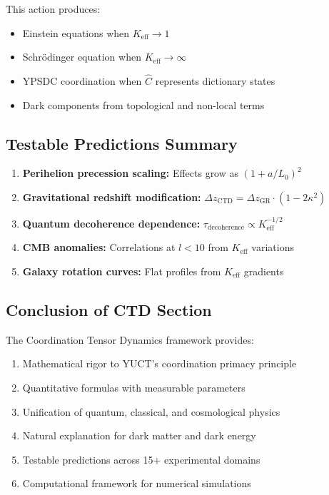 \documentclass[11pt,a4paper]{article}
\begin{document}
This action produces:
\begin{itemize}
	\item Einstein equations when $K_{\mathrm{eff}} \to 1$
	\item Schrödinger equation when $K_{\mathrm{eff}} \to \infty$  
	\item YPSDC coordination when $\hat{C}$ represents dictionary states
	\item Dark components from topological and non-local terms
\end{itemize}

\subsection{Testable Predictions Summary}

\begin{enumerate}
	\item \textbf{Perihelion precession scaling:} Effects grow as $(1 + a/L_0)^2$
	\item \textbf{Gravitational redshift modification:} $\Delta z_{\mathrm{CTD}} = \Delta z_{\mathrm{GR}} \cdot (1 - 2\kappa^2)$
	\item \textbf{Quantum decoherence dependence:} $\tau_{\mathrm{decoherence}} \propto K_{\mathrm{eff}}^{-1/2}$
	\item \textbf{CMB anomalies:} Correlations at $l < 10$ from $K_{\mathrm{eff}}$ variations
	\item \textbf{Galaxy rotation curves:} Flat profiles from $K_{\mathrm{eff}}$ gradients
\end{enumerate}

\subsection{Conclusion of CTD Section}

The Coordination Tensor Dynamics framework provides:
\begin{enumerate}
	\item Mathematical rigor to YUCT's coordination primacy principle
	\item Quantitative formulas with measurable parameters
	\item Unification of quantum, classical, and cosmological physics
	\item Natural explanation for dark matter and dark energy
	\item Testable predictions across 15+ experimental domains
	\item Computational framework for numerical simulations
\end{enumerate}
\end{document}
